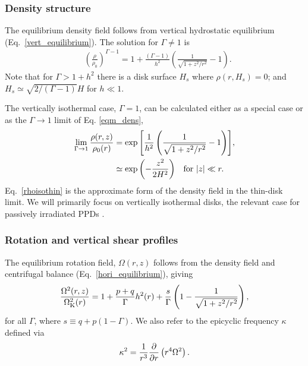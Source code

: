 \subsubsection{Density structure}
The equilibrium density field follows from vertical hydrostatic equilibrium (Eq.\ \ref{vert_equilibrium}).
The solution for $\Gamma\neq1$ is
\begin{align}\label{eqm_dens}
  &\left(\frac{\rho}{\rho_0}\right)^{\Gamma-1} = 1 +
  \frac{\left(\Gamma-1\right)}{ h^2}\left(\frac{1}{\sqrt{1+z^2/r^2}}-1\right).
\end{align}
Note that for $\Gamma > 1 +  h^2$ there is a disk surface $H_s$
where $\rho(r,H_s)=0$; and $H_s \simeq \sqrt{2/(\Gamma-1)}H$ for $h\ll 1$.

The vertically isothermal case, $\Gamma = 1$, can be calculated either 
as a special case or as the $\Gamma \rightarrow 1$ limit of Eq. \ref{eqm_dens},    
\begin{subequations}\begin{align}
\lim_{\Gamma\to1}  \frac{\rho(r,z)}{\rho_0(r)} &=
  \exp{\left[\frac{1}{ h^2}\left(\frac{1}{\sqrt{1+z^2/r^2}}-1\right)\right]},   \\
  & \simeq \exp {\left( - {z^2 \over 2 H^2}\right)} \quad\text{for } |z|\ll r \label{rhoisothin}. 
  \end{align}\end{subequations}
Eq.\ \ref{rhoisothin} is the approximate form of the density field in the thin-disk limit.  
We will primarily focus on 
vertically isothermal disks, the relevant case for passively irradiated
PPDs \citep{chiang97}. 

 
 \subsubsection{Rotation and vertical shear profiles}\label{vshear_def}
The equilibrium rotation field, $\Omega(r,z)$ follows from the density field and centrifugal balance (Eq.\ \ref{hori_equilibrium}),
giving 
\begin{align}\label{eqm_rot}
  \frac{\Omega^2(r,z)}{\Omega_{\rm K}^2(r)}=1 +
  \frac{p+q}{\Gamma} h^2(r) 
  +\frac{s}{\Gamma} \left(1-\frac{1}{\sqrt{1+z^2/r^2}}\right), 
\end{align}
for all $\Gamma$, where $s\equiv q+p(1-\Gamma)$.  We also refer to the
epicyclic frequency $\kappa$ defined via
\begin{align}\label{kap2_def}
\kappa^2 = \frac{1}{r^3}\frac{\partial}{\partial r}\left(r^4\Omega^2\right). 
\end{align}

